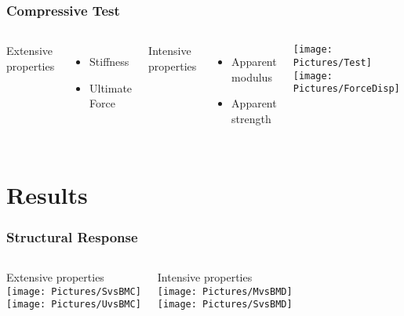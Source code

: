 \documentclass[xcolor=table,11pt]{beamer}
\begin{document}
	\begin{frame}
		\frametitle{Compressive Test}
		\begin{columns}
			Extensive properties
			\begin{itemize}
				\item Stiffness
				\item Ultimate Force
			\end{itemize}

			\vspace{5mm}

			Intensive properties
			\begin{itemize}
				\item Apparent modulus
				\item Apparent strength
			\end{itemize}


			\centering
			\hspace{-10mm}
			\texttt{[image: Pictures/Test]}
			\texttt{[image: Pictures/ForceDisp]}
		\end{columns}
	\end{frame}

	
	\section{Results}

	\begin{frame}
		\frametitle{Structural Response}
		\centering
		\vfill
		\begin{columns}
			\column{0.45\linewidth}
			\centering
			Extensive properties\\
			\vspace{2mm}
			\texttt{[image: Pictures/SvsBMC]}\\
			\texttt{[image: Pictures/UvsBMC]}

			\column{0.45\linewidth}
			\centering
			Intensive properties\\
			\vspace{2mm}
			\texttt{[image: Pictures/MvsBMD]}\\
			\texttt{[image: Pictures/SvsBMD]}
		\end{columns}
		\vfill
	\end{frame}
\end{document}
